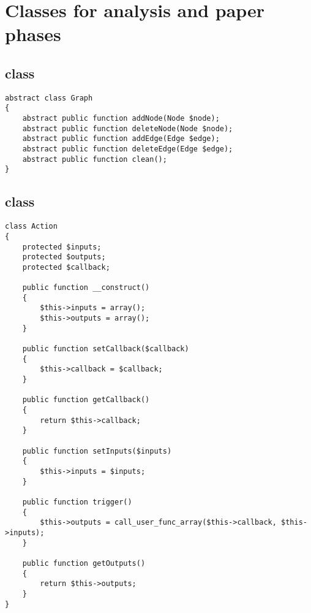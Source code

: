 \section{Classes for analysis and paper phases}%
\label{app:analysis}

\subsection{ class}%
\label{app:analysis:graph}

\begin{lstlisting}
abstract class Graph
{
    abstract public function addNode(Node $node);
    abstract public function deleteNode(Node $node);
    abstract public function addEdge(Edge $edge);
    abstract public function deleteEdge(Edge $edge);
    abstract public function clean();
}
\end{lstlisting}

\subsection{ class}%
\label{app:analysis:action}

\begin{lstlisting}
class Action
{
    protected $inputs;
    protected $outputs;
    protected $callback;

    public function __construct()
    {
        $this->inputs = array();
        $this->outputs = array();
    }

    public function setCallback($callback)
    {
        $this->callback = $callback;
    }

    public function getCallback()
    {
        return $this->callback;
    }

    public function setInputs($inputs)
    {
        $this->inputs = $inputs;
    }

    public function trigger()
    {
        $this->outputs = call_user_func_array($this->callback, $this->inputs);
    }

    public function getOutputs()
    {
        return $this->outputs;
    }
}
\end{lstlisting}


